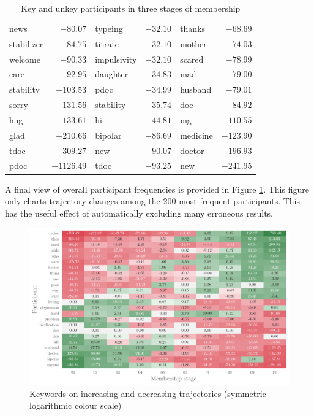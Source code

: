 \begin{table}[p]
\begin{tabular}{lrlrlr}
           news & $  -80.07$ &         typeing & $-32.10$ &      thanks & $ -68.69$ \\
     stabilizer & $  -84.75$ &         titrate & $-32.10$ &      mother & $ -74.03$ \\
        welcome & $  -90.33$ &     impulsivity & $-32.10$ &      scared & $ -78.99$ \\
           care & $  -92.95$ &        daughter & $-34.83$ &         mad & $ -79.00$ \\
      stability & $ -103.53$ &            pdoc & $-34.99$ &     husband & $ -79.01$ \\
          sorry & $ -131.56$ &       stability & $-35.74$ &         doc & $ -84.92$ \\
            hug & $ -133.61$ &              hi & $-44.81$ &          mg & $-110.55$ \\
           glad & $ -210.66$ &         bipolar & $-86.69$ &    medicine & $-123.90$ \\
           tdoc & $ -309.27$ &             new & $-90.07$ &      doctor & $-196.93$ \\
           pdoc & $-1126.49$ &            tdoc & $-93.25$ &         new & $-241.95$ \\
    \bottomrule
    \end{tabular}
    \caption{Key and unkey participants in three stages of membership}
    \label{tab:keyunkey-threestage}
    \end{table}


A final view of overall participant frequencies is provided in Figure \ref{fig:key-traj}. This figure only charts trajectory changes among the 200 most frequent participants. This has the useful effect of automatically excluding many erroneous results.

\begin{figure}[htb]
    \centering
    \small
    \includegraphics[width=1\textwidth]{../images/symlog-part2}
    \caption[Keywords on increasing and decreasing trajectories]{Keywords on increasing and decreasing trajectories (symmetric logarithmic colour scale)}
    \label{fig:key-traj}
    \end{figure}

